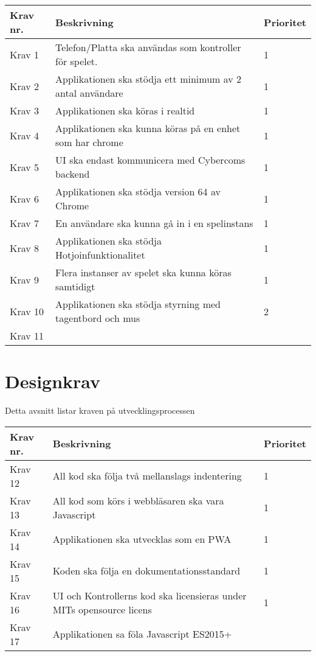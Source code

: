 \documentclass[10pt]{article}
\begin{document}
	\begin{tabular}{| p{2cm} | p{8cm} | p{2cm}|}
		\hline
		
		\textbf{Krav nr.} & \textbf{Beskrivning} &\textbf{Prioritet} \\ \hline
		Krav 1 & Telefon/Platta ska användas som kontroller för spelet. & 1 \\ \hline
		Krav 2 & Applikationen ska stödja ett minimum av 2 antal användare & 1 \\ \hline
		Krav 3 & Applikationen ska köras i realtid & 1 \\ \hline
		Krav 4 & Applikationen ska kunna köras på en enhet som har chrome & 1 \\ \hline
		Krav 5 & UI ska endast kommunicera med Cybercoms backend & 1 \\ \hline
		Krav 6 & Applikationen ska stödja version 64 av Chrome & 1 \\ \hline
		Krav 7 & En användare ska kunna gå in i en spelinstans & 1 \\ \hline
		Krav 8 & Applikationen ska stödja Hotjoinfunktionalitet & 1 \\ \hline
		Krav 9 & Flera instanser av spelet ska kunna köras samtidigt & 1 \\ \hline
		Krav 10 & Applikationen ska stödja styrning med tagentbord och mus & 2 \\ \hline
		Krav 11 & & \\ \hline
		
	\end{tabular}
	
\section{Designkrav}
	Detta avsnitt listar kraven på utvecklingsprocessen
	
	\begin{tabular}{| p{2cm} | p{8cm} | p{2cm}|}
		\hline
		\textbf{Krav nr.} & \textbf{Beskrivning} & \textbf{Prioritet} \\ \hline
		Krav 12 & All kod ska följa två mellanslags indentering & 1\\ \hline
		Krav 13 & All kod som körs i webbläsaren ska vara Javascript & 1 \\ \hline
		Krav 14 & Applikationen ska utvecklas som en PWA & 1 \\ \hline
		Krav 15 & Koden ska följa en dokumentationsstandard & 1 \\ \hline
		Krav 16 & UI och Kontrollerns kod ska licensieras under MITs opensource licens & 1 \\ \hline
		Krav 17 & Applikationen sa föla Javascript ES2015+ \\ \hline
	\end{tabular}
\pagebreak
\end{document}
